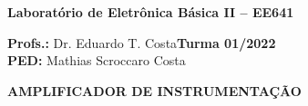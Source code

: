 \documentclass[addpoints]{exam}
\begin{document}
 
\large

\begin{center}
\Large
\textbf{Laboratório de Eletrônica Básica II – EE641}
\end{center}

\large
\vspace{2mm}

\noindent\textbf{Profs.:} Dr. Eduardo T. Costa\hfill \textbf{Turma 01/2022} \\
\textbf{PED:} Mathias Scroccaro Costa \hfill %

\normalsize
 
\vspace{5mm}
 

 
\noindent{}
\hfill
{}

\vspace{5mm}

\noindent{}
\hfill
{}

\vspace{5mm}

\noindent{}
\hfill
{}



\vspace{2mm}


\begin{center}
\large
\textbf{AMPLIFICADOR DE INSTRUMENTAÇÃO}
\normalsize
\end{center}
\end{document}
